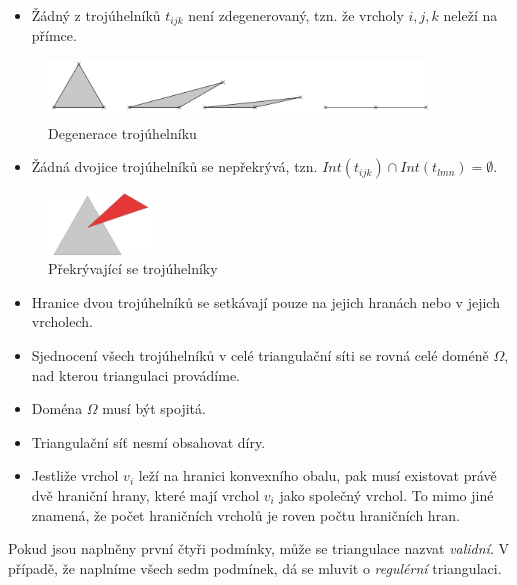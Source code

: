 \documentclass[12pt,a4paper]{article}
\begin{document}
{\begin{itemize}
\item Žádný z trojúhelníků $t_{ijk}$ není zdegenerovaný, tzn. že vrcholy $i, j, k$ neleží na přímce.
\end{itemize}
\begin{figure}[h!]
\centering
\includegraphics[width=0.9\textwidth]{img/podm_1.png}
\caption{Degenerace trojúhelníku}
\label{fig:podm_1}
\end{figure}
\begin{itemize}
\item Žádná dvojice trojúhelníků se nepřekrývá, tzn. $Int(t_{ijk}) \cap Int(t_{lmn}) = \emptyset$.
\end{itemize}
\begin{figure}[h!]
\centering
\includegraphics[width=0.25\textwidth]{img/podm_2.png}
\caption{Překrývající se trojúhelníky}
\label{fig:podm_2}
\end{figure}
\begin{itemize}
\item Hranice dvou trojúhelníků se setkávají pouze na jejich hranách
  nebo v jejich vrcholech.

\item Sjednocení všech trojúhelníků v celé triangulační síti se rovná
  celé doméně $\Omega$, nad kterou triangulaci provádíme.

\item Doména $\Omega$ musí být spojitá.

\item Triangulační síť nesmí obsahovat díry.

\item Jestliže vrchol $v_i$ leží na hranici konvexního obalu, pak musí
  existovat právě dvě hraniční hrany, které mají vrchol $v_i$ jako
  společný vrchol. To mimo jiné znamená, že počet hraničních vrcholů
  je roven počtu hraničních hran.
\end{itemize}
\bigskip

Pokud jsou naplněny první čtyři podmínky, může se triangulace nazvat
\emph{validní}. V případě, že naplníme všech sedm podmínek, dá se
mluvit o \emph{regulérní} triangulaci.

}
\end{document}
